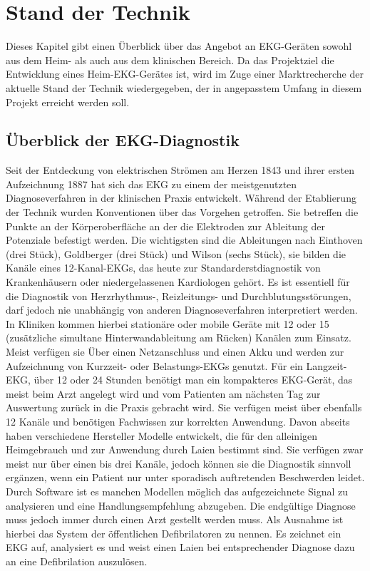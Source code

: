 
\section{Stand der Technik}

Dieses Kapitel gibt einen Überblick über das Angebot an EKG-Geräten sowohl aus dem Heim- als auch aus dem klinischen Bereich. Da das Projektziel die Entwicklung eines Heim-EKG-Gerätes ist, wird im Zuge einer Marktrecherche der aktuelle Stand der Technik wiedergegeben, der in angepasstem Umfang in diesem Projekt erreicht werden soll. 

\subsection{Überblick der EKG-Diagnostik}

Seit der Entdeckung von elektrischen Strömen am Herzen 1843 und ihrer ersten Aufzeichnung 1887 hat sich das EKG zu einem der meistgenutzten Diagnoseverfahren in der klinischen Praxis entwickelt. Während der Etablierung der Technik wurden Konventionen über das Vorgehen getroffen. Sie betreffen die Punkte an der Körperoberfläche an der die Elektroden zur Ableitung der Potenziale befestigt werden. Die wichtigsten sind die Ableitungen nach Einthoven (drei Stück), Goldberger (drei Stück) und Wilson (sechs Stück), sie bilden die Kanäle eines 12-Kanal-EKGs, das heute zur Standarderstdiagnostik von Krankenhäusern oder niedergelassenen Kardiologen gehört. Es ist essentiell für die Diagnostik von Herzrhythmus-, Reizleitungs- und Durchblutungsstörungen, darf jedoch nie unabhängig von anderen Diagnoseverfahren interpretiert werden. In Kliniken kommen hierbei stationäre oder mobile Geräte mit 12 oder 15 (zusätzliche simultane Hinterwandableitung am Rücken) Kanälen zum Einsatz. Meist verfügen sie Über einen Netzanschluss und einen Akku und werden zur Aufzeichnung von Kurzzeit- oder Belastungs-EKGs genutzt. Für ein Langzeit-EKG, über 12 oder 24 Stunden benötigt man ein kompakteres EKG-Gerät, das meist beim Arzt angelegt wird und vom Patienten am nächsten Tag zur Auswertung zurück in die Praxis gebracht wird. Sie verfügen meist über ebenfalls 12 Kanäle und benötigen Fachwissen zur korrekten Anwendung. Davon abseits haben verschiedene Hersteller Modelle entwickelt, die für den alleinigen Heimgebrauch und zur Anwendung durch Laien bestimmt sind. Sie verfügen zwar meist nur über einen bis drei Kanäle, jedoch können sie die Diagnostik sinnvoll ergänzen, wenn ein Patient nur unter sporadisch auftretenden Beschwerden leidet. Durch Software ist es manchen Modellen möglich das aufgezeichnete Signal zu analysieren und eine Handlungsempfehlung abzugeben. Die endgültige Diagnose muss jedoch immer durch einen Arzt gestellt werden muss. Als Ausnahme ist hierbei das System der öffentlichen Defibrilatoren zu nennen. Es zeichnet ein EKG auf, analysiert es und weist einen Laien bei entsprechender Diagnose dazu an eine Defibrilation auszulösen.

